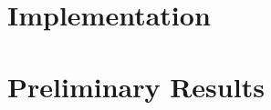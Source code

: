 \documentclass{article}
\begin{document}
\section{Implementation} %

 \maketitle
\section{Preliminary Results} %
\end{document}

